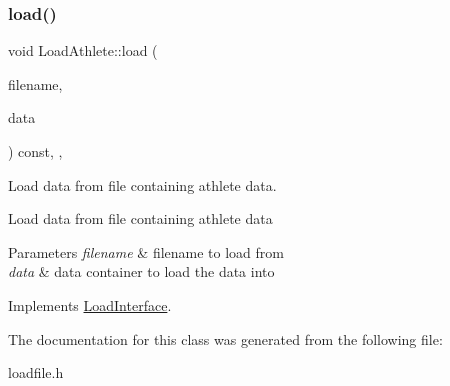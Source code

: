 \subsubsection{\texorpdfstring{load()}{load()}}
{\footnotesize\ttfamily void Load\+Athlete\+::load (\begin{DoxyParamCaption}\item[{std\+::string}]{filename,  }\item[{\mbox{\hyperlink{classFileDataContainer}{File\+Data\+Container}} $\ast$}]{data }\end{DoxyParamCaption}) const\hspace{0.3cm}{\ttfamily [inline]}, {\ttfamily [override]}, {\ttfamily [virtual]}}



Load data from file containing athlete data. 

Load data from file containing athlete data 
\begin{DoxyParams}{Parameters}
{\em filename} & filename to load from \\
\hline
{\em data} & data container to load the data into \\
\hline
\end{DoxyParams}


Implements \mbox{\hyperlink{classLoadInterface_a91bdc01550e64219c4007afce054fd40}{Load\+Interface}}.



The documentation for this class was generated from the following file\+:\begin{DoxyCompactItemize}
\item 
loadfile.\+h\end{DoxyCompactItemize}
